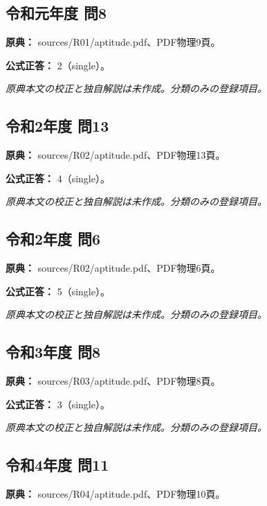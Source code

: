 \subsection{令和元年度 問8}
\label{q:r01-reg-apt-08}

\noindent\textbf{原典：} sources/R01/aptitude.pdf、PDF物理9頁。

\textbf{公式正答：} 2（single）。

\par\textit{原典本文の校正と独自解説は未作成。分類のみの登録項目。}

\subsection{令和2年度 問13}
\label{q:r02-reg-apt-13}

\noindent\textbf{原典：} sources/R02/aptitude.pdf、PDF物理13頁。

\textbf{公式正答：} 4（single）。

\par\textit{原典本文の校正と独自解説は未作成。分類のみの登録項目。}

\subsection{令和2年度 問6}
\label{q:r02-reg-apt-06}

\noindent\textbf{原典：} sources/R02/aptitude.pdf、PDF物理6頁。

\textbf{公式正答：} 5（single）。

\par\textit{原典本文の校正と独自解説は未作成。分類のみの登録項目。}

\subsection{令和3年度 問8}
\label{q:r03-reg-apt-08}

\noindent\textbf{原典：} sources/R03/aptitude.pdf、PDF物理8頁。

\textbf{公式正答：} 3（single）。

\par\textit{原典本文の校正と独自解説は未作成。分類のみの登録項目。}

\subsection{令和4年度 問11}
\label{q:r04-reg-apt-11}

\noindent\textbf{原典：} sources/R04/aptitude.pdf、PDF物理10頁。

